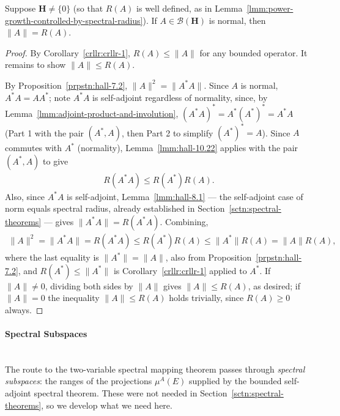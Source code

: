 \begin{proposition}
    \label{prpstn:hall-10.21}
    \leanok
    Suppose $\mathbf{H} \ne \{0\}$ (so that $R(A)$ is well defined, as in Lemma~\ref{lmm:power-growth-controlled-by-spectral-radius}). If $A \in \mathcal{B}(\mathbf{H})$ is normal, then $\|A\| = R(A)$.
\end{proposition}
\begin{proof}
    \leanok
By Corollary~\ref{crllr:crllr-1}, $R(A) \le \|A\|$ for any bounded operator. It remains to show $\|A\| \le R(A)$.

By Proposition~\ref{prpstn:hall-7.2}, $\|A\|^2 = \|A^*A\|$. Since $A$ is normal, $A^*A = AA^*$; note $A^*A$ is self-adjoint regardless of normality, since, by Lemma~\ref{lmm:adjoint-product-and-involution}, $(A^*A)^* = A^*(A^*)^* = A^*A$ (Part 1 with the pair $(A^*,A)$, then Part 2 to simplify $(A^*)^*=A$). Since $A$ commutes with $A^*$ (normality), Lemma~\ref{lmm:hall-10.22} applies with the pair $(A^*, A)$ to give
\begin{align}
    R(A^*A) \le R(A^*)R(A).
\end{align}
Also, since $A^*A$ is self-adjoint, Lemma~\ref{lmm:hall-8.1} — the self-adjoint case of norm equals spectral radius, already established in Section~\ref{sctn:spectral-theorems} — gives $\|A^*A\| = R(A^*A)$. Combining,
\begin{align}
    \|A\|^2 = \|A^*A\| = R(A^*A) \le R(A^*)R(A) \le \|A^*\|R(A) = \|A\|R(A),
\end{align}
where the last equality is $\|A^*\| = \|A\|$, also from Proposition~\ref{prpstn:hall-7.2}, and $R(A^*) \le \|A^*\|$ is Corollary~\ref{crllr:crllr-1} applied to $A^*$. If $\|A\| \ne 0$, dividing both sides by $\|A\|$ gives $\|A\| \le R(A)$, as desired; if $\|A\| = 0$ the inequality $\|A\| \le R(A)$ holds trivially, since $R(A) \ge 0$ always.
\end{proof}

\paragraph{Spectral Subspaces}\mbox{}\\
The route to the two-variable spectral mapping theorem passes through \textit{spectral subspaces}: the ranges of the projections $\mu^A(E)$ supplied by the bounded self-adjoint spectral theorem. These were not needed in Section~\ref{sctn:spectral-theorems}, so we develop what we need here.

